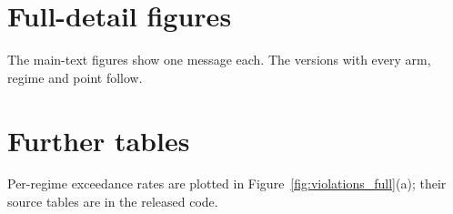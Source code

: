 \documentclass[10pt]{article}
\theoremstyle{plain}
\theoremstyle{definition}
\begin{document}
\clearpage\section{Full-detail figures}\label{app:figs}
The main-text figures show one message each. The versions with every arm, regime and point follow.





\section{Further tables}
Per-regime exceedance rates are plotted in Figure~\ref{fig:violations_full}(a); their source tables are in the released code.
\begin{table}[!htbp]\caption{All 18 frozen arms, pooled over \NRegimes{} simulated regimes. $q_{95},q_{99}$ and max are of $\sup_tH_t$.}\centering\small\end{table}
\begin{table}[!htbp]\caption{Real streams, clean feedback, pooled over 14 streams. Costs are equal-stream means; exceedance counts aggregate runs, with comparator thresholds $R=24$ and $R=60$ and each budget arm's own budget.}\centering\scriptsize\resizebox{\linewidth}{!}{}\end{table}
\begin{table}[!htbp]\caption{Real streams under adverse dropout, pooled over 14 streams. Costs are equal-stream means; exceedance counts aggregate runs at comparator thresholds $R=24$ and $R=60$, and violations use each budget arm's own budget.}\centering\scriptsize\resizebox{\linewidth}{!}{}\end{table}
\begin{table}[!htbp]\caption{Real streams under adverse delay, pooled over 14 streams. Costs are equal-stream means; exceedance counts aggregate runs at comparator thresholds $R=24$ and $R=60$, and violations use each budget arm's own budget.}\centering\scriptsize\resizebox{\linewidth}{!}{}\end{table}
\begin{table}[!htbp]\caption{Mean cost $J$ per stream on clean feedback, at $h=50$ ($R=60$); each row averages the available episodes for that stream.}\label{tab:perstream}\centering\scriptsize\end{table}
\end{document}
